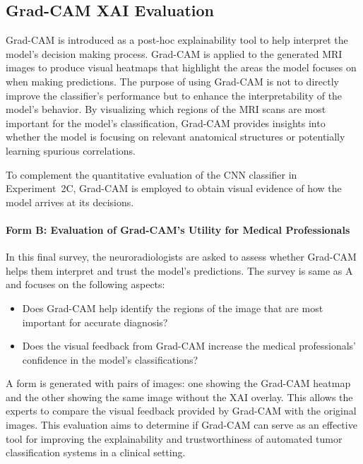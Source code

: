 \subsection{Grad-CAM XAI Evaluation}
Grad-CAM is introduced as a post-hoc explainability tool to help interpret the model’s decision making process. Grad-CAM is applied to the generated MRI images to produce visual heatmaps that highlight the areas the model focuses on when making predictions. The purpose of using Grad-CAM is not to directly improve the classifier’s performance but to enhance the interpretability of the model's behavior. By visualizing which regions of the MRI scans are most important for the model’s classification, Grad-CAM provides insights into whether the model is focusing on relevant anatomical structures or potentially learning spurious correlations.

To complement the quantitative evaluation of the CNN classifier in Experiment~2C, Grad-CAM is employed to obtain visual evidence of how the model arrives at its decisions.

\paragraph{Form B: Evaluation of Grad-CAM’s Utility for Medical Professionals} 
In this final survey, the neuroradiologists are asked to assess whether Grad-CAM helps them interpret and trust the model’s predictions. The survey is same as A and focuses on the following aspects:
\begin{itemize}
    \item Does Grad-CAM help identify the regions of the image that are most important for accurate diagnosis?
    \item Does the visual feedback from Grad-CAM increase the medical professionals' confidence in the model's classifications?
\end{itemize}

A form is generated with pairs of images: one showing the Grad-CAM heatmap and the other showing the same image without the XAI overlay. This allows the experts to compare the visual feedback provided by Grad-CAM with the original images. This evaluation aims to determine if Grad-CAM can serve as an effective tool for improving the explainability and trustworthiness of automated tumor classification systems in a clinical setting.

